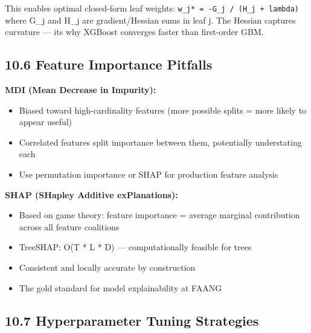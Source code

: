 \documentclass[11pt]{article}
\providecommand{\tightlist}{\setlength{\itemsep}{1pt}\setlength{\parskip}{0pt}}
\begin{document}
This enables optimal closed-form leaf weights: \texttt{w\_j*\ =\ -G\_j\ /\ (H\_j\ +\ lambda)} where G\_j and H\_j are gradient/Hessian sums in leaf j. The Hessian captures curvature --- it\textquotesingle s why XGBoost converges faster than first-order GBM.

\subsection{10.6 Feature Importance Pitfalls}\label{106-feature-importance-pitfalls}

\textbf{MDI (Mean Decrease in Impurity):}

\begin{itemize}
\tightlist
\item
  Biased toward high-cardinality features (more possible splits = more likely to appear useful)
\item
  Correlated features split importance between them, potentially understating each
\item
  Use permutation importance or SHAP for production feature analysis
\end{itemize}

\textbf{SHAP (SHapley Additive exPlanations):}

\begin{itemize}
\tightlist
\item
  Based on game theory: feature importance = average marginal contribution across all feature coalitions
\item
  TreeSHAP: O(T * L * D) --- computationally feasible for trees
\item
  Consistent and locally accurate by construction
\item
  The gold standard for model explainability at FAANG
\end{itemize}

\subsection{10.7 Hyperparameter Tuning Strategies}\label{107-hyperparameter-tuning-strategies}
\end{document}

